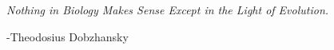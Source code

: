 \chapter*{}
\begin{center}
{\it Nothing in Biology Makes Sense Except in the Light of Evolution.}
\end{center}
\begin{flushright}
-Theodosius Dobzhansky
\end{flushright}